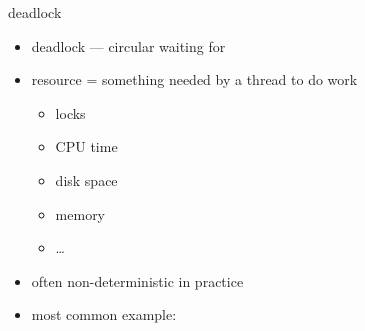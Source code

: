 \begin{frame}{deadlock}
\begin{itemize}
\item deadlock --- circular waiting for 
\vspace{.5cm}
\item resource = something needed by a thread to do work
  \begin{itemize}
  \item locks
  \item CPU time
  \item disk space
  \item memory
  \item \ldots
  \end{itemize}
\item often non-deterministic in practice
\item most common example: 
\end{itemize}
\end{frame}
